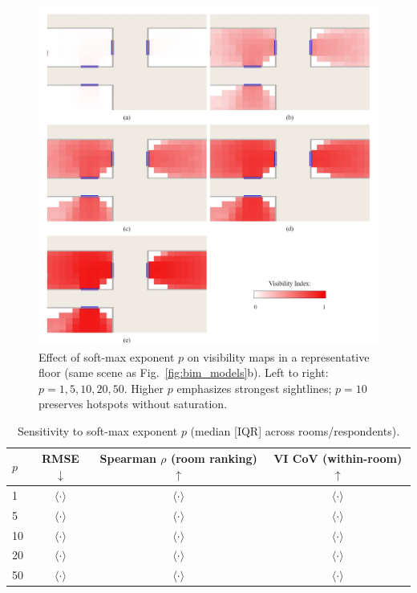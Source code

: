 \documentclass[final,3p,times,review]{elsarticle}
\begin{document}
\begin{figure}[H]
    \centering
    \includegraphics[width=1\textwidth]{P-value-impacts.jpg} %
    \caption{Effect of soft-max exponent $p$ on visibility maps in a representative floor (same scene as Fig.~\ref{fig:bim_models}b). Left to right: $p{=}1,5,10,20,50$. Higher $p$ emphasizes strongest sightlines; $p{=}10$ preserves hotspots without saturation.}
    \label{fig:p-sweep-heatmaps}
\end{figure}

\begin{table}[H]
\centering
\caption{Sensitivity to soft-max exponent $p$ (median [IQR] across rooms/respondents).}
\label{tab:p-sweep}
\begin{tabular}{@{}lccc@{}}
\toprule
$p$ & RMSE $\downarrow$ & Spearman $\rho$ (room ranking) $\uparrow$ & VI CoV (within-room) $\uparrow$ \\
\midrule
1  & $\langle\cdot\rangle$ & $\langle\cdot\rangle$ & $\langle\cdot\rangle$ \\
5  & $\langle\cdot\rangle$ & $\langle\cdot\rangle$ & $\langle\cdot\rangle$ \\
10 & $\langle\cdot\rangle$ & $\langle\cdot\rangle$ & $\langle\cdot\rangle$ \\
20 & $\langle\cdot\rangle$ & $\langle\cdot\rangle$ & $\langle\cdot\rangle$ \\
50 & $\langle\cdot\rangle$ & $\langle\cdot\rangle$ & $\langle\cdot\rangle$ \\
\bottomrule
\end{tabular}
\end{table}
\end{document}

